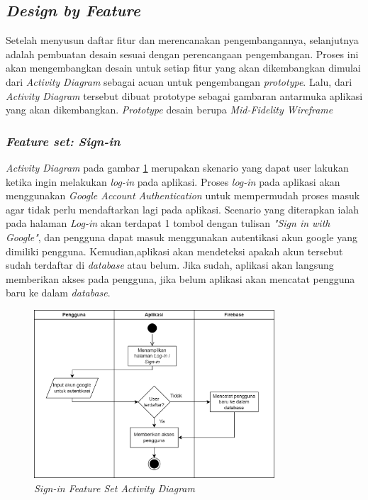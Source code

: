 \subsection{\textit{Design by Feature}}
Setelah menyusun daftar fitur dan merencanakan pengembangannya, selanjutnya adalah pembuatan desain sesuai dengan perencangaan pengembangan.
Proses ini akan mengembangkan desain untuk setiap fitur yang akan dikembangkan dimulai dari \textit{Activity Diagram} sebagai acuan untuk pengembangan \textit{prototype}. 
Lalu, dari \textit{Activity Diagram} tersebut dibuat prototype sebagai gambaran antarmuka aplikasi yang akan dikembangkan.
\textit{Prototype} desain berupa \textit{Mid-Fidelity Wireframe}
\subsubsection{\textit{Feature set: Sign-in}}
\textit{Activity Diagram} pada gambar \ref*{Fig:ActivityDiagramSignIn} merupakan skenario yang dapat user lakukan ketika ingin melakukan \textit{log-in} pada aplikasi.
Proses \textit{log-in} pada aplikasi akan menggunakan \textit{Google Account Authentication} untuk mempermudah proses masuk agar tidak perlu mendaftarkan lagi pada aplikasi.
Scenario yang diterapkan ialah pada halaman \textit{Log-in} akan terdapat 1 tombol dengan tulisan \textit{"Sign in with Google"}, dan pengguna dapat masuk menggunakan autentikasi akun google yang dimiliki pengguna.
Kemudian,aplikasi akan mendeteksi apakah akun tersebut sudah terdaftar di \textit{database} atau belum. Jika sudah, aplikasi akan langsung memberikan akses pada pengguna, jika belum aplikasi akan mencatat pengguna baru ke dalam \textit{database}.
\begin{figure}[H]
	\centering
	\includegraphics[width=0.8\textwidth]{contents/chapter-3/images/AD-signin.png}
	\caption{\textit{Sign-in Feature Set Activity Diagram}}
	\label{Fig:ActivityDiagramSignIn}
\end{figure}
